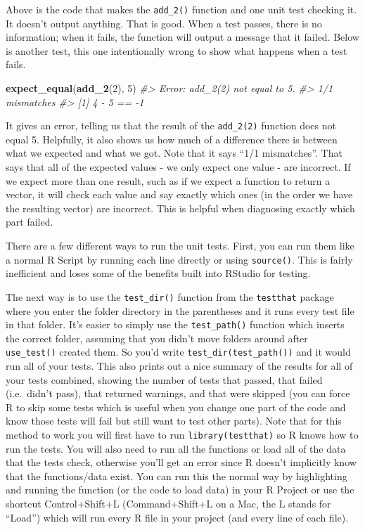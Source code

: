 \documentclass[
  12pt,
]{book}
\newenvironment{Shaded}{\begin{snugshade}}{\end{snugshade}}
\newcommand{\CommentTok}[1]{\textcolor[rgb]{0.37,0.37,0.37}{\textit{#1}}}
\newcommand{\DecValTok}[1]{\textcolor[rgb]{0.06,0.06,0.06}{#1}}
\newcommand{\KeywordTok}[1]{\textcolor[rgb]{0.27,0.27,0.27}{\textbf{#1}}}
\newcommand{\NormalTok}[1]{#1}
\begin{document}
Above is the code that makes the \texttt{add\_2()} function and one unit test checking it. It doesn't output anything. That is good. When a test passes, there is no information; when it fails, the function will output a message that it failed. Below is another test, this one intentionally wrong to show what happens when a test fails.

\begin{Shaded}
\begin{Highlighting}[]
\KeywordTok{expect\_equal}\NormalTok{(}\KeywordTok{add\_2}\NormalTok{(}\DecValTok{2}\NormalTok{), }\DecValTok{5}\NormalTok{)}
\CommentTok{\#\textgreater{} Error: add\_2(2) not equal to 5.}
\CommentTok{\#\textgreater{} 1/1 mismatches}
\CommentTok{\#\textgreater{} [1] 4 {-} 5 == {-}1}
\end{Highlighting}
\end{Shaded}

It gives an error, telling us that the result of the \texttt{add\_2(2)} function does not equal 5. Helpfully, it also shows us how much of a difference there is between what we expected and what we got. Note that it says ``1/1 mismatches''. That says that all of the expected values - we only expect one value - are incorrect. If we expect more than one result, such as if we expect a function to return a vector, it will check each value and say exactly which ones (in the order we have the resulting vector) are incorrect. This is helpful when diagnosing exactly which part failed.

There are a few different ways to run the unit tests. First, you can run them like a normal R Script by running each line directly or using \texttt{source()}. This is fairly inefficient and loses some of the benefits built into RStudio for testing.

The next way is to use the \texttt{test\_dir()} function from the \texttt{testthat} package where you enter the folder directory in the parentheses and it runs every test file in that folder. It's easier to simply use the \texttt{test\_path()} function which inserts the correct folder, assuming that you didn't move folders around after \texttt{use\_test()} created them. So you'd write \texttt{test\_dir(test\_path())} and it would run all of your tests. This also prints out a nice summary of the results for all of your tests combined, showing the number of tests that passed, that failed (i.e.~didn't pass), that returned warnings, and that were skipped (you can force R to skip some tests which is useful when you change one part of the code and know those tests will fail but still want to test other parts). Note that for this method to work you will first have to run \texttt{library(testthat)} so R knows how to run the tests. You will also need to run all the functions or load all of the data that the tests check, otherwise you'll get an error since R doesn't implicitly know that the functions/data exist. You can run this the normal way by highlighting and running the function (or the code to load data) in your R Project or use the shortcut Control+Shift+L (Command+Shift+L on a Mac, the L stands for ``Load'') which will run every R file in your project (and every line of each file).
\end{document}
